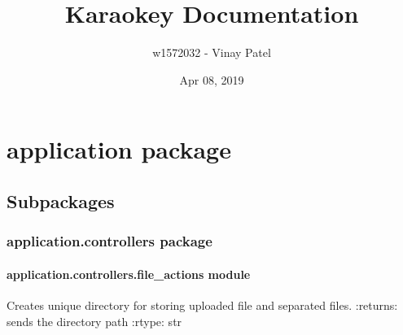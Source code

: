 \documentclass[letterpaper,10pt,english]{sphinxmanual}
\title{Karaokey Documentation}
\date{Apr 08, 2019}
\author{w1572032 - Vinay Patel}
\begin{document}
\pagestyle{empty}
\sphinxmaketitle
\pagestyle{plain}
\sphinxtableofcontents
\pagestyle{normal}
\label{\detokenize{index::doc}}



\chapter{application package}
\label{\detokenize{docs/source/application:application-package}}\label{\detokenize{docs/source/application::doc}}

\section{Subpackages}
\label{\detokenize{docs/source/application:subpackages}}

\subsection{application.controllers package}
\label{\detokenize{docs/source/application.controllers:application-controllers-package}}\label{\detokenize{docs/source/application.controllers::doc}}

\subsubsection{application.controllers.file\_actions module}
\label{\detokenize{docs/source/application.controllers:module-application.controllers.file_actions}}\label{\detokenize{docs/source/application.controllers:application-controllers-file-actions-module}}

\begin{fulllineitems}
\label{\detokenize{docs/source/application.controllers:application.controllers.file_actions.create_unique_dir}}
Creates unique directory for storing uploaded file and separated files.
:returns: sends the directory path
:rtype: str

\end{fulllineitems}

\end{document}
